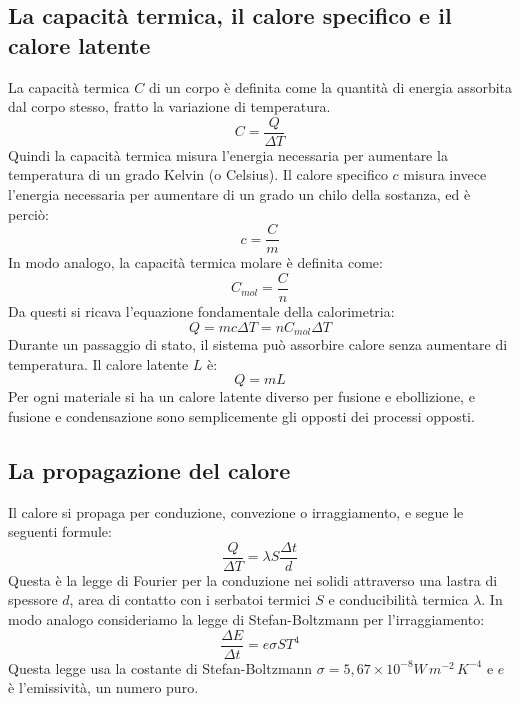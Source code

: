 \documentclass{article}
\begin{document}
\subsection{La capacità termica, il calore specifico e il calore latente}
La capacità termica $C$ di un corpo è definita come la quantità di energia assorbita dal corpo stesso, fratto la variazione di temperatura.
\begin{equation}
    C=\frac{Q}{\Delta T}
\end{equation}
Quindi la capacità termica misura l'energia necessaria per aumentare la temperatura di un grado Kelvin (o Celsius). 
Il calore specifico $c$ misura invece l'energia necessaria per aumentare di un grado un chilo della sostanza, ed è perciò:
\begin{equation}
    c=\frac{C}{m}
\end{equation}
In modo analogo, la capacità termica molare è definita come:
\begin{equation}
    C_{mol}=\frac{C}{n}
\end{equation}
Da questi si ricava l'equazione fondamentale della calorimetria:
\begin{equation}
    Q=mc\Delta T=nC_{mol}\Delta T
\end{equation}
Durante un passaggio di stato, il sistema può assorbire calore senza aumentare di temperatura. Il calore latente $L$ è:
\begin{equation}
    Q=mL
\end{equation}
Per ogni materiale si ha un calore latente diverso per fusione e ebollizione, e fusione e condensazione sono semplicemente gli opposti dei processi opposti.

\subsection{La propagazione del calore}
Il calore si propaga per conduzione, convezione o irraggiamento, e segue le seguenti formule:
\begin{equation}
    \frac{Q}{\Delta T}=\lambda S \frac{\Delta t}{d}
\end{equation}
Questa è la legge di Fourier per la conduzione nei solidi attraverso una lastra di spessore $d$, area di contatto con i serbatoi termici $S$ e conducibilità termica $\lambda$.
In modo analogo consideriamo la legge di Stefan-Boltzmann per l'irraggiamento:
\begin{equation}
    \frac{\Delta E}{\Delta t}=e\sigma S T^4
\end{equation}
Questa legge usa la costante di Stefan-Boltzmann $\sigma=5,67\times 10^{-8} W\,m^{-2}\,K^{-4}$ e $e$ è l'emissività, un numero puro. 
\end{document}
